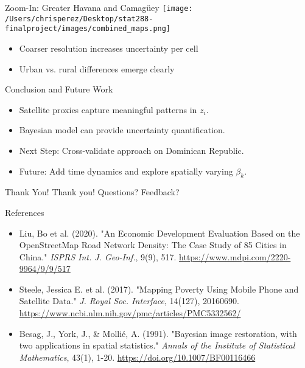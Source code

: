 \documentclass{beamer}
\begin{document}
    

\begin{frame}{Zoom-In: Greater Havana and Camagüey}
\texttt{[image: /Users/chrisperez/Desktop/stat288-finalproject/images/combined\_maps.png]}
\begin{itemize}
  \item Coarser resolution increases uncertainty per cell
  \item Urban vs. rural differences emerge clearly
\end{itemize}
\end{frame}


\begin{frame}{Conclusion and Future Work}
  \begin{itemize}
    \item Satellite proxies capture meaningful patterns in $z_i$.
    \item Bayesian model can provide uncertainty quantification.
    \item Next Step: Cross-validate approach on Dominican Republic.
    \item Future: Add time dynamics and explore spatially varying $\beta_k$.
  \end{itemize}
  \end{frame}
  
\begin{frame}{Thank You!}
  \centering
  \Large
  Thank you! 
  Questions? Feedback?
\end{frame}

\begin{frame}{References}
  \begin{itemize}
    \item Liu, Bo et al. (2020). "An Economic Development Evaluation Based on the OpenStreetMap Road Network Density: The Case Study of 85 Cities in China." \textit{ISPRS Int. J. Geo-Inf.}, 9(9), 517. \href{https://www.mdpi.com/2220-9964/9/9/517}{https://www.mdpi.com/2220-9964/9/9/517}
    \item Steele, Jessica E. et al. (2017). "Mapping Poverty Using Mobile Phone and Satellite Data." \textit{J. Royal Soc. Interface}, 14(127), 20160690. \href{https://www.ncbi.nlm.nih.gov/pmc/articles/PMC5332562/}{https://www.ncbi.nlm.nih.gov/pmc/articles/PMC5332562/}
    \item Besag, J., York, J., \& Mollié, A. (1991). "Bayesian image restoration, with two applications in spatial statistics." \textit{Annals of the Institute of Statistical Mathematics}, 43(1), 1-20. \href{https://doi.org/10.1007/BF00116466}{https://doi.org/10.1007/BF00116466}
  \end{itemize}
  \end{frame}
\end{document}
